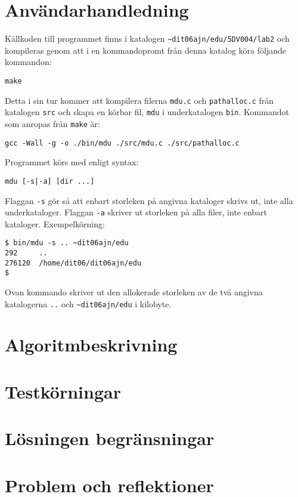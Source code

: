 \documentclass[a4paper, 12pt]{article}
\begin{document}
\section{Användarhandledning}\label{sec:anvandarhandledning}
Källkoden till programmet finns i katalogen
\verb!~dit06ajn/edu/5DV004/lab2! och kompileras genom att i en
kommandopromt från denna katalog köra följande kommandon:

\verb!make!

Detta i sin tur kommer att kompilera filerna \verb!mdu.c! och
\verb!pathalloc.c! från katalogen \verb!src! och skapa en körbar fil,
\verb!mdu! i underkatalogen \verb!bin!. Kommandot som anropas från
\verb!make! är:

\verb!gcc -Wall -g -o ./bin/mdu ./src/mdu.c ./src/pathalloc.c!

Programmet körs med enligt syntax:

\verb!mdu [-s|-a] [dir ...]!

Flaggan \verb!-s! gör så att enbart storleken på angivna kataloger
skrivs ut, inte alla underkataloger. Flaggan \verb!-a!  skriver ut
storleken på alla filer, inte enbart kataloger. Exempelkörning:

\begin{verbatim}
$ bin/mdu -s .. ~dit06ajn/edu
292     ..
276120  /home/dit06/dit06ajn/edu
$
\end{verbatim}

Ovan kommando skriver ut den allokerade storleken av de två angivna
katalogerna \verb!..! och \verb!~dit06ajn/edu! i kilobyte.

% 
% 

\section{Algoritmbeskrivning}\label{sec:algoritmbeskrivning}

\section{Testkörningar}\label{sec:testkorningar}

\section{Lösningen begränsningar}\label{sec:losningensbegransningar}

\section{Problem och reflektioner}\label{sec:problemochreflektioner}
\end{document}
